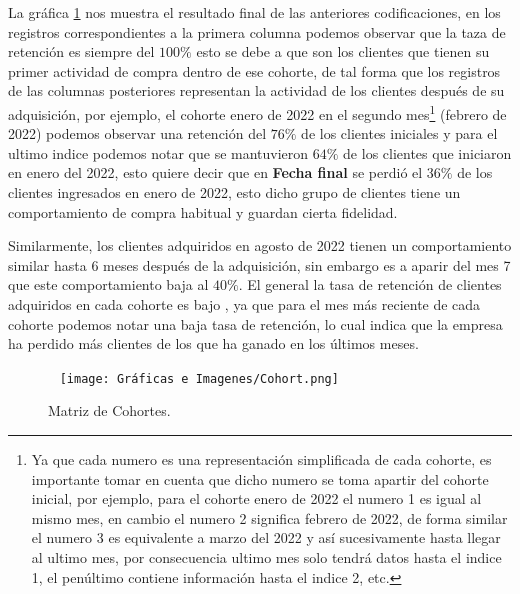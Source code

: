 La gráfica \ref{fig:CohortesCount} nos muestra el resultado final de las anteriores codificaciones, en los registros correspondientes a la primera columna podemos observar que la taza de retención es siempre del $100\%$ esto se debe a que son los clientes que tienen su primer actividad de compra dentro de ese cohorte, de tal forma que los registros de las columnas posteriores representan la actividad de los clientes después de su adquisición, por ejemplo, el cohorte enero de 2022 en el segundo mes\footnote{Ya que cada numero es una representación simplificada de cada cohorte, es importante tomar en cuenta que dicho numero se toma apartir del cohorte inicial, por ejemplo, para el cohorte enero de 2022 el numero 1 es igual al mismo mes, en cambio el numero 2 significa febrero de 2022, de forma similar el numero 3 es equivalente a marzo del 2022 y así sucesivamente hasta llegar al ultimo mes, por consecuencia ultimo mes solo tendrá datos hasta el indice 1, el penúltimo contiene información hasta el indice 2, etc.} (febrero de 2022) podemos observar una retención del $76\%$ de los clientes iniciales y para el ultimo indice podemos notar que se mantuvieron $64\%$ de los clientes que iniciaron en enero del 2022, esto quiere decir que en \textbf{Fecha final} se perdió el $36\%$ de los clientes ingresados en enero de 2022, esto dicho grupo de clientes tiene un comportamiento de compra habitual y guardan cierta fidelidad.


Similarmente, los clientes adquiridos en agosto de 2022 tienen un comportamiento similar hasta 6 meses después de la adquisición, sin embargo es a aparir del mes 7 que este comportamiento baja al $40\%$. El general la tasa de retención de clientes adquiridos en cada cohorte es bajo , ya que para el mes más reciente de cada cohorte podemos notar una baja tasa de retención, lo cual indica que la empresa ha perdido más clientes de los que ha ganado en los últimos meses.



	\begin{figure}[p]
		\vspace{-55mm}
		\hspace*{-5cm}
		\
		\texttt{[image: Gráficas e Imagenes/Cohort.png]}
		\caption{Matriz de Cohortes.}
		\label{fig:CohortesCount}
	\end{figure}




